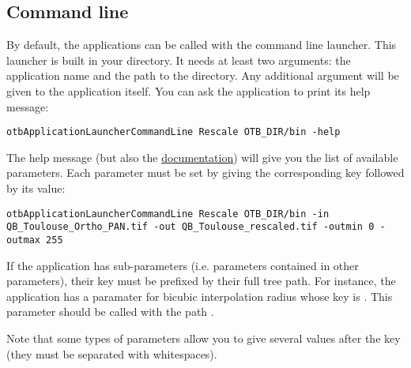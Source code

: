 \subsection{Command line}\label{sec:wrappedAppliCmdLine}
By default, the applications can be called with the command line launcher. This launcher
is built in your  directory. It needs at least two arguments: the 
application name and the path to the  directory. Any additional argument
will be given to the application itself. You can ask the application to print its help
message:
\begin{verbatim}
otbApplicationLauncherCommandLine Rescale OTB_DIR/bin -help
\end{verbatim}
The help message (but also the \href{http://orfeo-toolbox.org/Applications}{documentation})
will give you the list of available parameters. Each parameter must be set by giving the 
corresponding key followed by its value:
\begin{verbatim}
otbApplicationLauncherCommandLine Rescale OTB_DIR/bin -in QB_Toulouse_Ortho_PAN.tif -out QB_Toulouse_rescaled.tif -outmin 0 -outmax 255
\end{verbatim}

If the application has sub-parameters (i.e. parameters contained in other parameters), 
their key must be prefixed by their full tree path. For instance, the application 
 has a paramater for bicubic interpolation radius whose key is .
This parameter should be called with the path .

Note that some types of parameters allow you to give several values after the key (they must
be separated with whitespaces).

